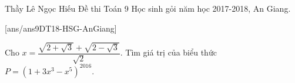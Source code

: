 \begin{name}
{Thầy Lê Ngọc Hiếu}
{Đề thi Toán 9 Học sinh gỏi năm học 2017-2018, An Giang.}
\end{name}
\setcounter{ex}{0}
[ans/ans9DT18-HSG-AnGiang]
\begin{ex}%
	Cho $x=\dfrac{\sqrt{2+\sqrt{3}}+\sqrt{2-\sqrt{3}}}{\sqrt{2}}$. 	Tìm giá trị của biểu thức $P=\left(1+3x^3-x^5 \right) ^{2016}$.
\end{ex}
